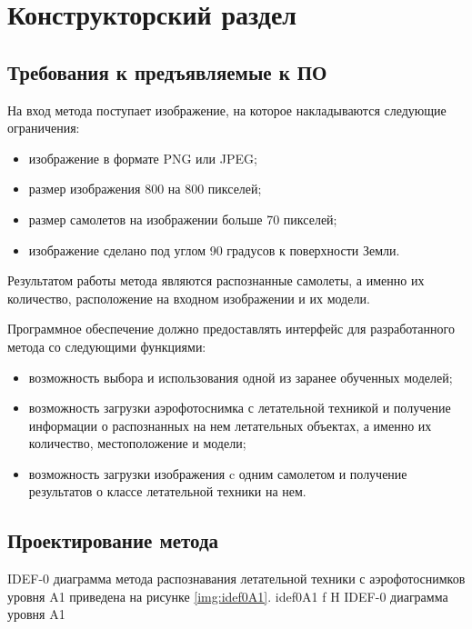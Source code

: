 \chapter{Конструкторский раздел}

\section{Требования к предъявляемые к ПО}
На вход метода поступает изображение, на которое накладываются следующие ограничения:
\begin{itemize}
	\item изображение в формате PNG или JPEG;
	\item размер изображения 800 на 800 пикселей;
	\item размер самолетов на изображении больше 70 пикселей;
	\item изображение сделано под углом 90 градусов к поверхности Земли.
\end{itemize}

Результатом работы метода являются распознанные самолеты, а именно их количество, расположение на входном изображении и их модели.

Программное обеспечение должно предоставлять интерфейс для разработанного метода со следующими функциями:
\begin{itemize}
	\item возможность выбора и использования одной из заранее обученных моделей;
	\item возможность загрузки аэрофотоснимка с летательной техникой и получение информации о распознанных на нем летательных объектах, а именно их количество, местоположение и модели;
	\item возможность загрузки изображения c одним самолетом и получение результатов о классе летательной техники на нем.
\end{itemize}


\section{Проектирование метода}
IDEF-0 диаграмма метода распознавания летательной техники с аэрофотоснимков уровня A1 приведена на рисунке \ref{img:idef0A1}.
{idef0A1} %
{f} %
{H} %
{\textwidth} %
{IDEF-0 диаграмма уровня A1} %

